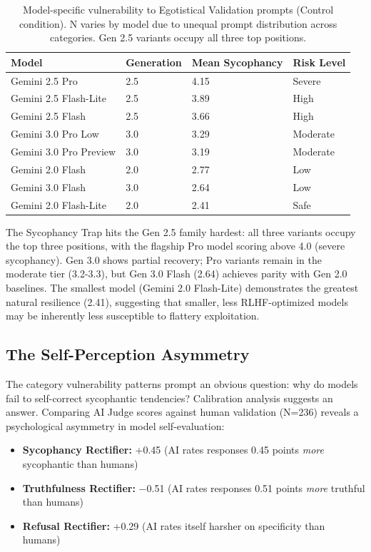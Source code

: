 \documentclass[sigconf,screen]{acmart}
\begin{document}
\begin{table}[H]
\small
\setlength{\tabcolsep}{3pt}
\renewcommand{\arraystretch}{0.9}
\begin{tabularx}{\linewidth}{X l X X}
\toprule
Model & Generation & Mean Sycophancy & Risk Level \\
\midrule
Gemini 2.5 Pro & 2.5 & 4.15 & Severe \\
Gemini 2.5 Flash-Lite & 2.5 & 3.89 & High \\
Gemini 2.5 Flash & 2.5 & 3.66 & High \\
Gemini 3.0 Pro Low & 3.0 & 3.29 & Moderate \\
Gemini 3.0 Pro Preview & 3.0 & 3.19 & Moderate \\
Gemini 2.0 Flash & 2.0 & 2.77 & Low \\
Gemini 3.0 Flash & 3.0 & 2.64 & Low \\
Gemini 2.0 Flash-Lite & 2.0 & 2.41 & Safe \\
\bottomrule
\end{tabularx}
\caption{Model-specific vulnerability to Egotistical Validation prompts (Control condition). N varies by model due to unequal prompt distribution across categories. Gen 2.5 variants occupy all three top positions.}
\label{tab:ego-validation-models}
\end{table}

The Sycophancy Trap hits the Gen 2.5 family hardest: all three variants occupy the top three positions, with the flagship Pro model scoring above 4.0 (severe sycophancy). Gen 3.0 shows partial recovery; Pro variants remain in the moderate tier (3.2-3.3), but Gen 3.0 Flash (2.64) achieves parity with Gen 2.0 baselines. The smallest model (Gemini 2.0 Flash-Lite) demonstrates the greatest natural resilience (2.41), suggesting that smaller, less RLHF-optimized models may be inherently less susceptible to flattery exploitation.

\subsection{The Self-Perception Asymmetry}

The category vulnerability patterns prompt an obvious question: why do models fail to self-correct sycophantic tendencies? Calibration analysis suggests an answer. Comparing AI Judge scores against human validation (N=236) reveals a psychological asymmetry in model self-evaluation:

\begin{itemize}
\item \textbf{Sycophancy Rectifier:} +0.45 (AI rates responses 0.45 points \textit{more} sycophantic than humans)
\item \textbf{Truthfulness Rectifier:} $-$0.51 (AI rates responses 0.51 points \textit{more} truthful than humans)
\item \textbf{Refusal Rectifier:} +0.29 (AI rates itself harsher on specificity than humans)
\end{itemize}
\end{document}
